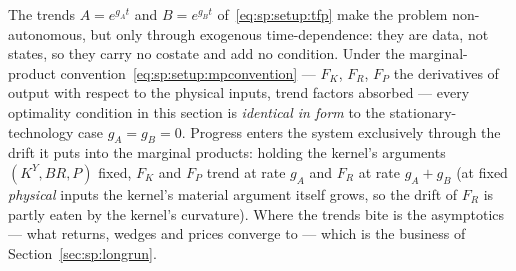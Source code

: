  The trends $A=e^{g_At}$ and $B=e^{g_Bt}$
of~\eqref{eq:sp:setup:tfp} make the problem non-autonomous, but only through exogenous
time-dependence: they are data, not states, so they carry no costate and add no condition.
Under the marginal-product convention~\eqref{eq:sp:setup:mpconvention} --- $F_K$, $F_R$, $F_P$
the derivatives of output with respect to the physical inputs, trend factors absorbed ---
every optimality condition in this section is \emph{identical in form} to the
stationary-technology case $g_A=g_B=0$. Progress enters the system exclusively through the
drift it puts into the marginal products: holding the kernel's arguments
$\left(K^Y,BR,P\right)$ fixed, $F_K$ and $F_P$ trend at rate $g_A$ and $F_R$ at rate
$g_A+g_B$ (at fixed \emph{physical} inputs the kernel's material argument itself grows, so
the drift of $F_R$ is partly eaten by the kernel's curvature). Where the trends bite is the asymptotics --- what
returns, wedges and prices converge to --- which is the business of
Section~\ref{sec:sp:longrun}.

